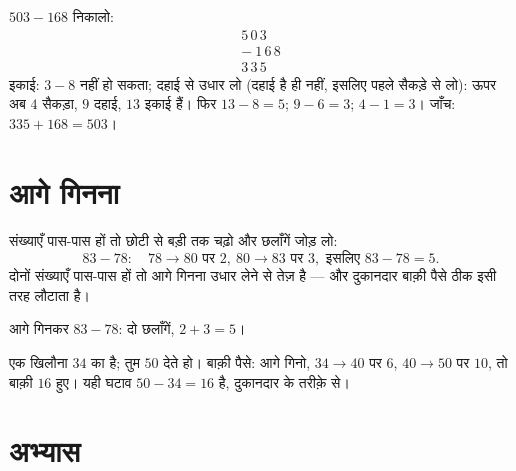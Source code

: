 \begin{example}\label{ex:g2:subtraction:worked}
$503 - 168$ निकालो:
\[
\begin{array}{r}
5\,0\,3 \\
-\ 1\,6\,8 \\
\hline
3\,3\,5
\end{array}
\]
इकाई: $3 - 8$ नहीं हो सकता; दहाई से उधार लो (दहाई है ही नहीं,
इसलिए पहले सैकड़े से लो): ऊपर अब $4$ सैकड़ा,
$9$ दहाई, $13$ इकाई हैं। फिर $13 - 8 = 5$; $9 - 6 = 3$;
$4 - 1 = 3$। जाँच: $335 + 168 = 503$। \checkmark
\end{example}

\section{आगे गिनना}

\begin{method}[आगे गिनकर घटाना]\label{met:g2:subtraction:countup}
संख्याएँ पास-पास हों तो छोटी से बड़ी तक चढ़ो और छलाँगें जोड़
लो:
\[
83 - 78: \quad 78 \to 80 \text{ पर } 2, \ 80 \to 83 \text{ पर } 3,
\text{ इसलिए } 83 - 78 = 5 .
\]
दोनों संख्याएँ पास-पास हों तो आगे गिनना उधार लेने से तेज़ है ---
और दुकानदार बाक़ी पैसे ठीक इसी तरह लौटाता है।
\end{method}

\begin{omfigure}

{\small आगे गिनकर $83 - 78$: दो छलाँगें, $2 + 3 = 5$।}
\end{omfigure}

\begin{example}[बाक़ी पैसे लौटाना]\label{ex:g2:subtraction:change}
एक खिलौना $34$ का है; तुम $50$ देते हो। बाक़ी पैसे: आगे गिनो,
$34 \to 40$ पर $6$, $40 \to 50$ पर $10$, तो बाक़ी $16$ हुए।
यही घटाव $50 - 34 = 16$ है, दुकानदार के तरीक़े से।
\end{example}

\section{अभ्यास}

